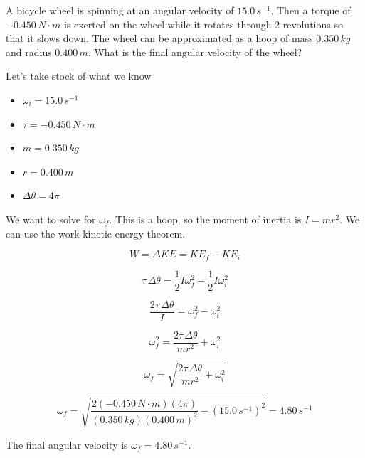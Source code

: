 \documentclass[12pt]{book}
\begin{document}
\begin{exampleblock}

A bicycle wheel is spinning at an angular velocity of $15.0 \, s^{-1}$. Then a torque of $-0.450 \, N \cdot m$ is exerted on the wheel while it rotates through 2 revolutions so that it slows down. The wheel can be approximated as a hoop of mass $0.350 \, kg$ and radius $0.400 \, m$. What is the final angular velocity of the wheel?

\hspace{10pt}

Let's take stock of what we know

\begin{itemize}
\item $\omega_i = 15.0 \, s^{-1}$
\item $\tau = -0.450 \, N \cdot m$
\item $m = 0.350 \, kg$
\item $r = 0.400 \, m$
\item $\Delta \theta = 4 \pi$
\end{itemize}

We want to solve for $\omega_f$. This is a hoop, so the moment of inertia is $I = mr^2$. We can use the work-kinetic energy theorem.

\begin{equation}
W = \Delta KE = KE_f - KE_i
\end{equation}

\begin{equation}
\tau \, \Delta \theta = \frac{1}{2} I \omega_f^2 - \frac{1}{2} I \omega_i^2
\end{equation}

\begin{equation}
\frac{2 \tau \, \Delta \theta}{I} = \omega_f^2 - \omega_i^2
\end{equation}

\begin{equation}
\omega_f^2 = \frac{2 \tau \, \Delta \theta}{mr^2} + \omega_i^2
\end{equation}

\begin{equation}
\omega_f = \sqrt{ \frac{2 \tau \, \Delta \theta}{mr^2} + \omega_i^2}
\end{equation}

\begin{equation}
\omega_f = \sqrt{ \frac{2 (-0.450 \, N \cdot m) (4 \pi)}{(0.350 \, kg)(0.400 \, m)^2} - (15.0 \, s^{-1})^2} = 4.80 \, s^{-1}
\end{equation}

The final angular velocity is $\omega_f = 4.80 \, s^{-1}$.

\end{exampleblock}
\end{document}
